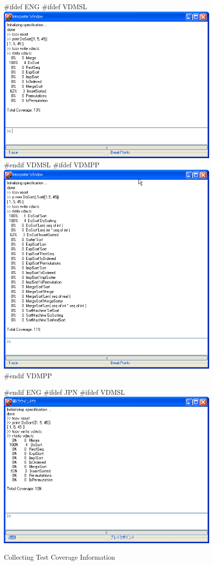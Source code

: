\documentclass[\pformat,12pt]{article}
\begin{document}
\begin{figure}[tbh]
\begin{center}
#ifdef ENG
#ifdef VDMSL
\includegraphics[width=12.5cm]{testCov-slENG.png}
#endif VDMSL
#ifdef VDMPP
\includegraphics[width=12.5cm]{testCov-ppENG.png}
#endif VDMPP
\caption{Collecting Test Coverage Information}
#endif ENG
#ifdef JPN
#ifdef VDMSL
\includegraphics[width=12.5cm]{testCov-sl.png}

\end{center}
\end{figure}
\end{document}
